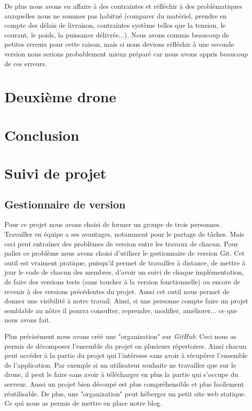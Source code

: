 \documentclass[a4paper,10pt]{report}
\begin{document}
      De plus nous avons eu affaire à des contraintes et réfléchir à des 
problématiques auxquelles nous ne sommes pas habitué (comparer du matériel, 
prendre en compte des délais de livraison, contraintes système telles que la 
tension, le courant, le poids, la puissance délivrée...). Nous avons commis 
beaucoup de petites erreurs pour cette raison, mais si nous devions réfléchir à 
une seconde version nous serions probablement mieux préparé car nous avons 
appris beaucoup de ces erreurs.
  
  \chapter{Deuxième drone}
  
  \chapter{Conclusion}
  
  \appendix
    \chapter{Suivi de projet}
      \section{Gestionnaire de version}
	Pour ce projet nous avons choisi de former un groupe de trois 
personnes. Travailler en équipe a ses avantages, notamment pour le partage de 
tâches. Mais ceci peut entraîner des problèmes de version entre les travaux de 
chacun. Pour palier ce problème nous avons choisi d'utiliser le gestionnaire 
de version Git\cite{git}. Cet outil est vraiment pratique, puisqu'il permet de 
travailler à distance, de mettre à jour le code de chacun des membres, d'avoir 
un suivi de chaque implémentation, de faire des versions tests (sans toucher à 
la version fonctionnelle) ou encore de revenir à des versions précédentes du 
projet. Aussi cet outil nous permet de donner une visibilité à notre travail. 
Ainsi, si une personne compte faire un projet semblable au nôtre il pourra 
consulter, reprendre, modifier, améliorer... ce que nous avons fait.

	Plus précisément nous avons créé une "organization"\cite{njordgit} sur 
\textit{GitHub}\cite{github}. Ceci nous as permis de décomposer l'ensemble du 
projet en plusieurs répertoires. Ainsi chacun peut accéder à la partie du 
projet qui l'intéresse sans avoir à récupérer l'ensemble de l'application. Par 
exemple si un utilisateur souhaite ne travailler que sur le drone, il peut le 
faire sans avoir à télécharger en plus la partie qui s'occupe du serveur. Aussi 
un projet bien découpé est plus compréhensible et plus facilement réutilisable. 
De plus, une "organization" peut héberger un petit site web statique. Ce qui 
nous as permis de mettre en place notre blog\cite{njordblog}. 
	
\end{document}
